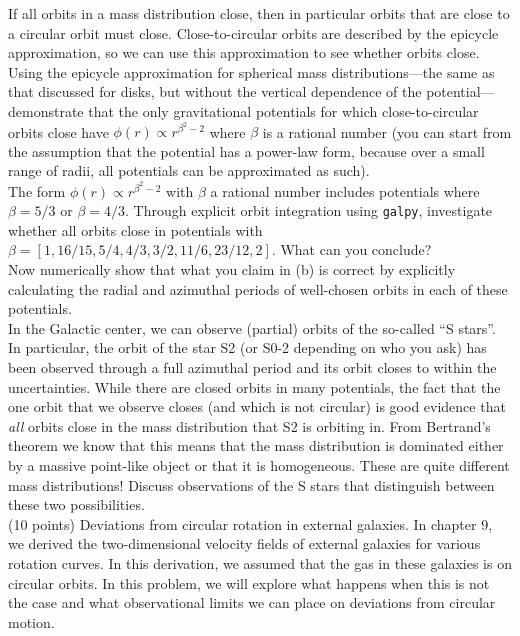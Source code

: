 \documentclass[12pt]{article}
\begin{document}
 If all orbits in a mass distribution close, then in
particular orbits that are close to a circular orbit must
close. Close-to-circular orbits are described by the epicycle
approximation, so we can use this approximation to see whether orbits
close. Using the epicycle approximation for spherical mass
distributions---the same as that discussed for disks, but without the
vertical dependence of the potential---demonstrate that the only
gravitational potentials for which close-to-circular orbits close have
$\phi(r) \propto r^{\beta^2-2}$ where $\beta$ is a rational number
(you can start from the assumption that the potential has a power-law
form, because over a small range of radii, all potentials can be
approximated as such).\\

 The form $\phi(r) \propto r^{\beta^2-2}$ with
$\beta$ a rational number includes potentials where $\beta=5/3$ or
$\beta=4/3$. Through explicit orbit integration using \texttt{galpy},
investigate whether all orbits close in potentials with $\beta =
[1,16/15,5/4,4/3,3/2,11/6,23/12,2]$. What can you conclude?\\

 Now numerically show that what you claim in (b) is
correct by explicitly calculating the radial and azimuthal periods of
well-chosen orbits in each of these potentials.\\

 In the Galactic center, we can observe (partial)
orbits of the so-called ``S stars''. In particular, the orbit of the
star S2 (or S0-2 depending on who you ask) has been observed through a
full azimuthal period and its orbit closes to within the
uncertainties. While there are closed orbits in many potentials, the
fact that the one orbit that we observe closes (and which is not
circular) is good evidence that \emph{all} orbits close in the mass
distribution that S2 is orbiting in. From Bertrand's theorem we know
that this means that the mass distribution is dominated either by a
massive point-like object or that it is homogeneous. These are quite
different mass distributions! Discuss observations of the S stars that
distinguish between these two possibilities.\\

 (10 points) Deviations from circular
rotation in external galaxies. In chapter 9, we derived the
two-dimensional velocity fields of external galaxies for various
rotation curves. In this derivation, we assumed that the gas in these
galaxies is on circular orbits. In this problem, we will explore what
happens when this is not the case and what observational limits we can
place on deviations from circular motion.\\
\end{document}
